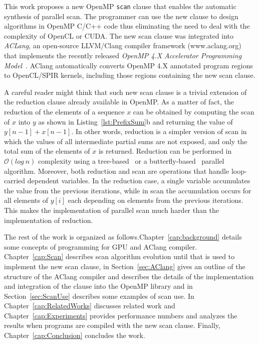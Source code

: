 \documentclass[Ingles]{ic-tese-v1}
\newcommand{\rcap}[1]{Chapter~\ref{cap:#1}}
\newcommand{\rsec}[1]{Section~\ref{sec:#1}}
\newcommand{\rlsts}[2]{Listing~\ref{lst:#1}{#2}}
\begin{document}
This work proposes a new OpenMP \texttt{scan} clause that enables the
automatic synthesis of parallel  scan.  The programmer can
use the new  clause to  design algorithms in OpenMP C/C++ code
thus eliminating the need to deal with  the complexity of OpenCL or CUDA.
The  new   scan  clause   was  integrated  into   \textit{ACLang},  an
open-source LLVM/Clang compiler framework (www.aclang.org) that
implements  the  recently   released  \textit{OpenMP  4.X  Accelerator
	Programming   Model}~\cite{MPereira2017}.     AClang   automatically
converts OpenMP 4.X annotated program regions to OpenCL/SPIR kernels, 
including those regions containing the new scan clause.


A careful  reader might think that  such new scan clause  is a trivial
extension of the  reduction clause already available in  OpenMP.  As a
matter of fact, the reduction of the elements of a sequence $x$ can be
obtained  by  computing  the  scan  of   $x$  into  $y$  as  shown  in
\rlsts{PrefixSum}{b} and returning the value of $y[n-1] + x[n-1]$.  In
other  words, reduction  is a  simpler version  of scan  in which  the
values of all intermediate partial sums  are not exposed, and only the
total  sum of  the  elements of  $x$ is  returned.   Reduction can  be
performed    in    $\mathcal{O}(log\    n)$   complexity    using    a
tree-based~\cite{tree-based}                    or                   a
butterfly-based~\cite{butterfly-based} parallel  algorithm.  Moreover,
both  reduction  and  scan  are operations  that  handle  loop-carried
dependent  variables.   In  the  reduction  case,  a  single  variable
accumulates the value from the  previous iterations, while in scan the
accumulation  occurs for  all  elements of  $y[i]$  each depending  on
elements from the previous  iterations.  This makes the implementation
of parallel scan much harder than the implementation of reduction.

The rest of the work is organized as follows.\rcap{background} details 
some concepts of programming for GPU and AClang compiler. \rcap{Scan} 
describes scan algorithm evolution until that is used to implement the
new scan clause, in \rsec{AClang} gives an outline  of the structure of
the AClang compiler  and   describes  the  details  of   the  implementation 
and integration     of    the     clause    into     the    OpenMP
library and in \rsec{ScanUse} describes some examples of scan use.
In \rcap{RelatedWorks} discusses related work and 
\rcap{Experiments} provides  performance numbers and analyzes
the results  when programs  are compiled with  the new scan clause.
Finally, \rcap{Conclusion} concludes the work.
\end{document}
